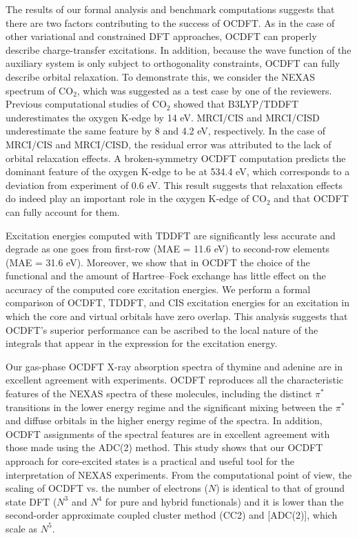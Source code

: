 \documentclass{article}
\begin{document}
The results of our formal analysis and benchmark computations suggests that there are two factors contributing to the success of OCDFT.
As in the case of other variational and constrained DFT approaches, OCDFT can properly describe charge-transfer excitations.
In addition, because the wave function of the auxiliary system is only subject to orthogonality constraints, OCDFT can fully describe orbital relaxation.
To demonstrate this, we consider the NEXAS spectrum of CO$_2$, which was suggested as a test case by one of the reviewers. 
Previous computational studies of CO$_2$\cite{Maganas:ji} showed that B3LYP/TDDFT underestimates the oxygen K-edge by 14 eV.
MRCI/CIS and MRCI/CISD underestimate the same feature by 8 and 4.2 eV, respectively.
In the case of MRCI/CIS and MRCI/CISD, the residual error was attributed to the lack of orbital relaxation effects.
A broken-symmetry OCDFT computation predicts the dominant feature of the oxygen K-edge to be at 534.4 eV, which corresponds to a deviation from experiment of 0.6 eV.  This result suggests that relaxation effects do indeed play an important role in the oxygen K-edge of CO$_2$ and that OCDFT can fully account for them.

Excitation energies computed with TDDFT are significantly less accurate and degrade as one goes from first-row (MAE = 11.6 eV) to second-row elements (MAE = 31.6 eV).
Moreover, we show that in OCDFT the choice of the functional and the amount of Hartree--Fock exchange has little effect on the accuracy of the computed core excitation energies.
We perform a formal comparison of OCDFT, TDDFT, and CIS excitation energies for an excitation in which the core and virtual orbitals have zero overlap.
This analysis suggests that OCDFT's superior performance can be ascribed to the local nature of the integrals that appear in the expression for the excitation energy.

Our gas-phase OCDFT X-ray absorption spectra of thymine and adenine are in excellent agreement with experiments. 
OCDFT reproduces all the characteristic features of the NEXAS spectra of these molecules,\cite{plekan_theoretical_2008,wenzel_calculating_2014} including the distinct $\pi^*$ transitions in the lower energy regime and the significant mixing between the $\pi^*$ and diffuse orbitals in the higher energy regime of the spectra.
In addition, OCDFT assignments of the spectral features are in excellent agreement with those made using the ADC(2) method.\cite{plekan_theoretical_2008}
This study shows that our OCDFT approach for core-excited states is a practical and useful tool for the interpretation of NEXAS experiments. 
From the computational point of view, the scaling of OCDFT vs. the number of electrons ($N$) is identical to that of ground state DFT ($N^3$ and $N^4$ for pure and hybrid functionals) and it is lower than the second-order approximate coupled cluster method (CC2)\cite{christiansen_cc2_1995} and [ADC(2)], which scale as $N^5$.
\end{document}
